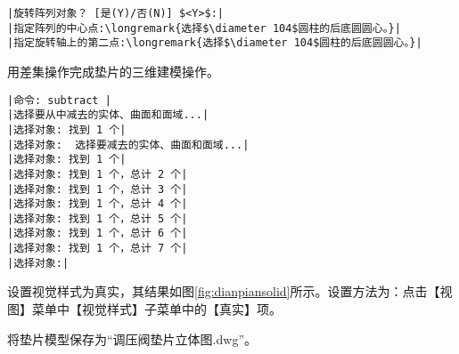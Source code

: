 \begin{procedure}
\begin{lstlisting}
|旋转阵列对象？ [是(Y)/否(N)] $<Y>$:|
|指定阵列的中心点:\longremark{选择$\diameter 104$圆柱的后底圆圆心。}|
|指定旋转轴上的第二点:\longremark{选择$\diameter 104$圆柱的后底圆圆心。}|
\end{lstlisting}
\showremarks
\item 用差集操作完成垫片的三维建模操作。
\begin{lstlisting}
|命令: subtract |
|选择要从中减去的实体、曲面和面域...|
|选择对象: 找到 1 个|
|选择对象:  选择要减去的实体、曲面和面域...|
|选择对象: 找到 1 个|
|选择对象: 找到 1 个，总计 2 个|
|选择对象: 找到 1 个，总计 3 个|
|选择对象: 找到 1 个，总计 4 个|
|选择对象: 找到 1 个，总计 5 个|
|选择对象: 找到 1 个，总计 6 个|
|选择对象: 找到 1 个，总计 7 个|
|选择对象:|
\end{lstlisting}
\item 设置视觉样式为真实，其结果如图\ref{fig:dianpiansolid}所示。设置方法为：点击【视图】菜单中【视觉样式】子菜单中的【真实】项。
\item 将垫片模型保存为“调压阀垫片立体图.dwg”。
\end{procedure}

\endinput